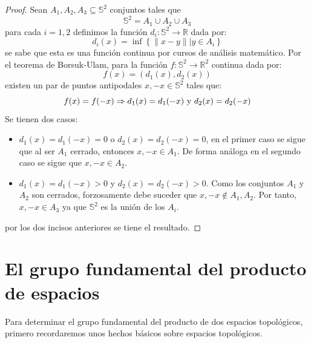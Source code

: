 \documentclass[12pt]{report}
\theoremstyle{largebreak}
\newcommand\cf[3]{\ensuremath{#1:#2\rightarrow#3}}
\begin{document}
    \begin{proof}
        Sean $A_1,A_2,A_3\subseteq\mathbb{S}^2$ conjuntos tales que
        \begin{equation*}
            \mathbb{S}^2=A_1\cup A_2\cup A_3
        \end{equation*}
        para cada $i=1,2$ definimos la función $\cf{d_i}{\mathbb{S}^2}{\mathbb{R}}$ dada por:
        \begin{equation*}
            d_i(x)=\inf\left\{\|x-y\|\Big|y\in A_i \right\}
        \end{equation*}
        se sabe que esta es una función continua por cursos de análisis matemático. Por el teorema de Borsuk-Ulam, para la función $\cf{f}{\mathbb{S}^2}{\mathbb{R}^2}$ continua dada por:
        \begin{equation*}
            f(x)=(d_1(x),d_2(x))
        \end{equation*}
        existen un par de puntos antipodales $x,-x\in\mathbb{S}^2$ tales que:
        \begin{equation*}
            f(x)=f(-x)\Rightarrow d_1(x)=d_1(-x)\textup{ y }d_2(x)=d_2(-x)
        \end{equation*}
        Se tienen dos casos:
        \begin{itemize}
            \item $d_1(x)=d_1(-x)=0$ o $d_2(x)=d_2(-x)=0$, en el primer caso se sigue que al ser $A_1$ cerrado, entonces $x,-x\in A_1$. De forma análoga en el segundo caso se sigue que $x,-x\in A_2$.
            \item $d_1(x)=d_1(-x)>0$ y $d_2(x)=d_2(-x)>0$. Como los conjuntos $A_1$ y $A_2$ son cerrados, forzosamente debe suceder que $x,-x\notin A_1,A_2$. Por tanto, $x,-x\in A_3$ ya que $\mathbb{S}^2$ es la unión de los $A_i$.
        \end{itemize}
        por los dos incisos anteriores se tiene el resultado.
    \end{proof}

    \section{El grupo fundamental del producto de espacios}

    Para determinar el grupo fundamental del producto de dos espacios topológicos, primero recordaremos unos hechos básicos sobre espacios topológicos.
\end{document}
